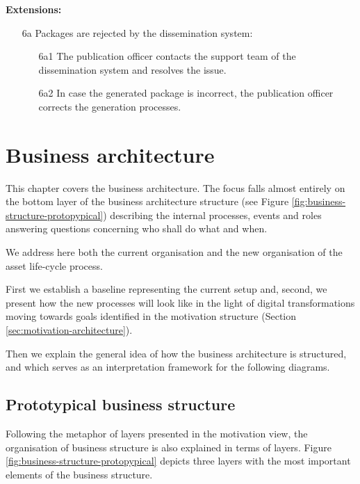 	\textbf{Extensions:}
	\enlargethispage{5\baselineskip}
	\begin{enumerate}
		\item [6a] Packages are rejected by the dissemination system:
		\begin{enumerate}
			\item [6a1] The publication officer contacts the support team of the dissemination system and resolves the issue. 
			\item [6a2] In case the generated package is incorrect, the publication officer corrects the generation processes.
		\end{enumerate}
	\end{enumerate}


	
\chapter{Business architecture}
\label{sec:business-architecture}
	
	This chapter covers the business architecture. The focus falls almost entirely on the bottom layer of the business architecture structure (see Figure \ref{fig:business-structure-protopypical}) describing the internal processes, events and roles answering questions concerning who shall do what and when.
		
	We address here both the current organisation and the new organisation of the asset life-cycle process. 
	
	First we establish a baseline representing the current setup and, second, we present how the new processes will look like in the light of digital transformations moving towards goals identified in the motivation structure (Section \ref{sec:motivation-architecture}).
	
	Then we explain the general idea of how the business architecture is structured, and which serves as an interpretation framework for the following diagrams. 	
	
	\section{Prototypical business structure}
	
	Following the metaphor of layers presented in the motivation view, the organisation of business structure is also explained in terms of layers. Figure \ref{fig:business-structure-protopypical} depicts three layers with the most important elements of the business structure. 
	
